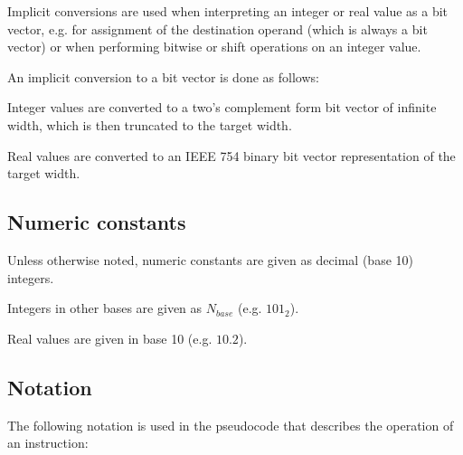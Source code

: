 Implicit conversions are used when interpreting an integer or real value as a
bit vector, e.g. for assignment of the destination operand (which is always a
bit vector) or when performing bitwise or shift operations on an integer value.

An implicit conversion to a bit vector is done as follows:

\begin{bulletitems}
  \item Integer values are converted to a two's complement form bit vector of
        infinite width, which is then truncated to the target width.
  \item Real values are converted to an IEEE 754 binary bit vector
        representation of the target width.
\end{bulletitems}

\subsection{Numeric constants}

Unless otherwise noted, numeric constants are given as decimal (base 10)
integers.

Integers in other bases are given as $N_{base}$ (e.g. $101_{2}$).

Real values are given in base 10 (e.g. $10.2$).

\subsection{Notation}

The following notation is used in the pseudocode that describes the operation
of an instruction:

